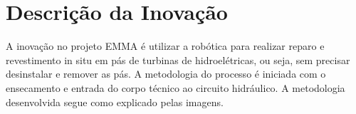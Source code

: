 
\section{Descrição da Inovação}

A inovação no projeto EMMA é utilizar a robótica para realizar reparo e
revestimento in situ em pás de turbinas de hidroelétricas, ou seja, sem precisar
desinstalar e remover as pás. A metodologia do processo é iniciada com o
ensecamento e entrada do corpo técnico ao circuito hidráulico. A metodologia
desenvolvida segue como explicado pelas imagens.

% 
% 
% 


